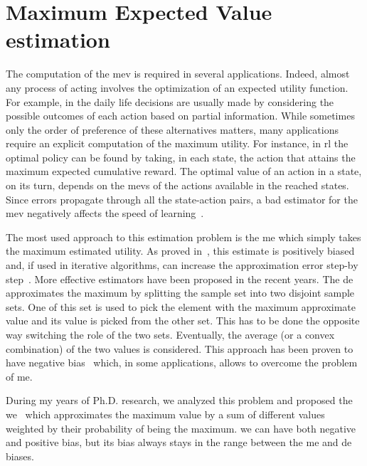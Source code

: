\chapter{Maximum Expected Value estimation}\label{C:mev}
\newcommand{\est}[1]{\hat\mu_*^{#1}}
\newcommand{\transpose}[1]{{#1}^\texttt{T}}

The computation of the \gls{mev} is required in several applications. Indeed, almost any process of acting involves the optimization of an expected utility function. For example, in the daily life decisions are usually made by considering the possible outcomes of each action based on partial information.
While sometimes only the order of preference of these alternatives matters, many applications require an explicit computation of the maximum utility.
For instance, in \gls{rl} the optimal policy can be found by taking, in each state, the action that attains the maximum expected cumulative reward. The optimal value of an action in a state, on its turn, depends on the \glspl{mev} of the actions available in the reached states.
Since errors propagate through all the state-action pairs, a bad estimator for the \gls{mev} negatively affects the speed of learning~\cite{van2010double}.

The most used approach to this estimation problem is the \gls{me} which simply takes the maximum estimated utility. As proved in~\cite{smith2006optimizer}, this estimate is positively biased and, if used in iterative algorithms, can increase the approximation error step-by step~\cite{van2010double}. More effective estimators have been proposed in the recent years. The \gls{de}~\cite{van2013estimating} approximates the maximum by splitting the sample set into two disjoint sample sets. One of this set is used to pick the element with the maximum approximate value and its value is picked from the other set. This has to be done the opposite way switching the role of the two sets. Eventually, the average (or a convex combination) of the two values is considered. This approach has been proven to have negative bias~\cite{van2013estimating} which, in some applications, allows to overcome the problem of \gls{me}.

During my years of Ph.D. research, we analyzed this problem and proposed the \gls{we}~\cite{deramo2016estimating} which approximates the maximum value by a sum of different values weighted by their probability of being the maximum. \gls{we} can have both negative and positive bias, but its bias always stays in the range between the \gls{me} and \gls{de} biases.

